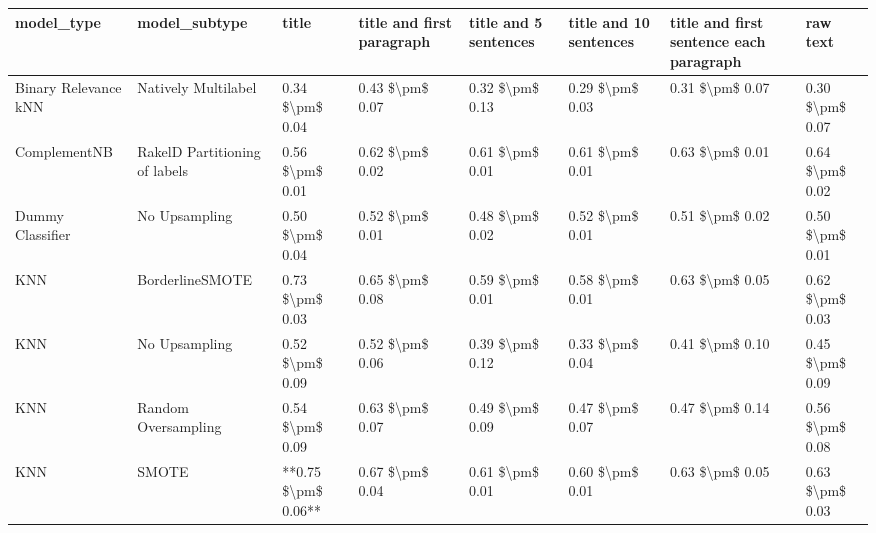 \begin{tabular}{llllllll}
\toprule
                     model\_type &                 model\_subtype &               title & title and first paragraph & title and 5 sentences & title and 10 sentences & title and first sentence each paragraph &            raw text \\
\midrule
           Binary Relevance kNN &           Natively Multilabel &     0.34 \$\textbackslash pm\$ 0.04 &           0.43 \$\textbackslash pm\$ 0.07 &       0.32 \$\textbackslash pm\$ 0.13 &        0.29 \$\textbackslash pm\$ 0.03 &                         0.31 \$\textbackslash pm\$ 0.07 &     0.30 \$\textbackslash pm\$ 0.07 \\
                   ComplementNB & RakelD Partitioning of labels &     0.56 \$\textbackslash pm\$ 0.01 &           0.62 \$\textbackslash pm\$ 0.02 &       0.61 \$\textbackslash pm\$ 0.01 &        0.61 \$\textbackslash pm\$ 0.01 &                         0.63 \$\textbackslash pm\$ 0.01 &     0.64 \$\textbackslash pm\$ 0.02 \\
               Dummy Classifier &                 No Upsampling &     0.50 \$\textbackslash pm\$ 0.04 &           0.52 \$\textbackslash pm\$ 0.01 &       0.48 \$\textbackslash pm\$ 0.02 &        0.52 \$\textbackslash pm\$ 0.01 &                         0.51 \$\textbackslash pm\$ 0.02 &     0.50 \$\textbackslash pm\$ 0.01 \\
                            KNN &               BorderlineSMOTE &     0.73 \$\textbackslash pm\$ 0.03 &           0.65 \$\textbackslash pm\$ 0.08 &       0.59 \$\textbackslash pm\$ 0.01 &        0.58 \$\textbackslash pm\$ 0.01 &                         0.63 \$\textbackslash pm\$ 0.05 &     0.62 \$\textbackslash pm\$ 0.03 \\
                            KNN &                 No Upsampling &     0.52 \$\textbackslash pm\$ 0.09 &           0.52 \$\textbackslash pm\$ 0.06 &       0.39 \$\textbackslash pm\$ 0.12 &        0.33 \$\textbackslash pm\$ 0.04 &                         0.41 \$\textbackslash pm\$ 0.10 &     0.45 \$\textbackslash pm\$ 0.09 \\
                            KNN &           Random Oversampling &     0.54 \$\textbackslash pm\$ 0.09 &           0.63 \$\textbackslash pm\$ 0.07 &       0.49 \$\textbackslash pm\$ 0.09 &        0.47 \$\textbackslash pm\$ 0.07 &                         0.47 \$\textbackslash pm\$ 0.14 &     0.56 \$\textbackslash pm\$ 0.08 \\
                            KNN &                         SMOTE & **0.75 \$\textbackslash pm\$ 0.06** &           0.67 \$\textbackslash pm\$ 0.04 &       0.61 \$\textbackslash pm\$ 0.01 &        0.60 \$\textbackslash pm\$ 0.01 &                         0.63 \$\textbackslash pm\$ 0.05 &     0.63 \$\textbackslash pm\$ 0.03 \\

\end{tabular}

